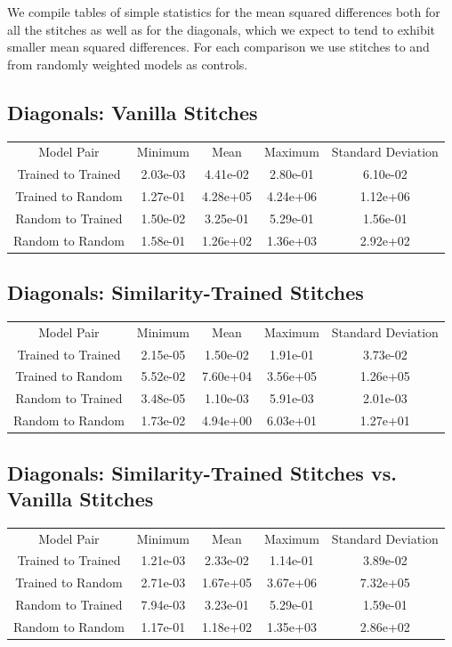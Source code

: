 \documentclass{article} %
\begin{document}
We compile tables of simple statistics for the mean squared differences both for all the stitches as well
as for the diagonals, which we expect to tend to exhibit smaller mean squared differences. For each comparison
we use stitches to and from randomly weighted models as controls.

\subsection*{Diagonals: Vanilla Stitches}
\label{Table1}
\begin{tabular}{c c c c c}
   Model Pair&Minimum&Mean&Maximum&Standard Deviation\\
   Trained to Trained&2.03e-03&4.41e-02&2.80e-01&6.10e-02\\
   Trained to Random&1.27e-01&4.28e+05&4.24e+06&1.12e+06\\
   Random to Trained&1.50e-02&3.25e-01&5.29e-01&1.56e-01\\
   Random to Random&1.58e-01&1.26e+02&1.36e+03&2.92e+02\\
\end{tabular}

\label{Table2}
\subsection*{Diagonals: Similarity-Trained Stitches}
\begin{tabular}{c c c c c}
   Model Pair&Minimum&Mean&Maximum&Standard Deviation\\
   Trained to Trained&2.15e-05&1.50e-02&1.91e-01&3.73e-02\\
   Trained to Random&5.52e-02&7.60e+04&3.56e+05&1.26e+05\\
   Random to Trained&3.48e-05&1.10e-03&5.91e-03&2.01e-03\\
   Random to Random&1.73e-02&4.94e+00&6.03e+01&1.27e+01\\
\end{tabular}

\label{Table3}
\subsection*{Diagonals: Similarity-Trained Stitches vs. Vanilla Stitches}
\begin{tabular}{c c c c c}
   Model Pair&Minimum&Mean&Maximum&Standard Deviation\\
   Trained to Trained&1.21e-03&2.33e-02&1.14e-01&3.89e-02\\
   Trained to Random&2.71e-03&1.67e+05&3.67e+06&7.32e+05\\
   Random to Trained&7.94e-03&3.23e-01&5.29e-01&1.59e-01\\
   Random to Random&1.17e-01&1.18e+02&1.35e+03&2.86e+02\\
\end{tabular}
\end{document}
